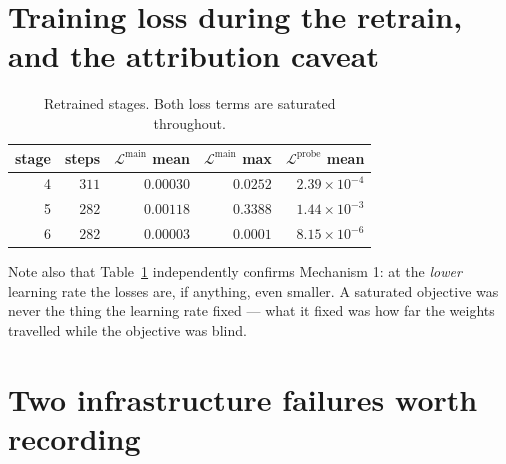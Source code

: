\documentclass[11pt]{article}
\theoremstyle{definition}
\begin{document}
\section{Training loss during the retrain, and the attribution caveat}
\label{sec:attribution}

\begin{table}[h]
\centering
\begin{tabular}{rrrrr}
\toprule
stage & steps & $\mathcal{L}^{\mathrm{main}}$ mean & $\mathcal{L}^{\mathrm{main}}$ max & $\mathcal{L}^{\mathrm{probe}}$ mean\\
\midrule
4 & $311$ & $0.00030$ & $0.0252$ & $2.39\times10^{-4}$\\
5 & $282$ & $0.00118$ & $0.3388$ & $1.44\times10^{-3}$\\
6 & $282$ & $0.00003$ & $0.0001$ & $8.15\times10^{-6}$\\
\bottomrule
\end{tabular}
\caption{Retrained stages. Both loss terms are saturated throughout.}
\label{tab:retrain-loss}
\end{table}

\begin{center}
\end{center}

Note also that Table~\ref{tab:retrain-loss} independently confirms Mechanism 1: at the \emph{lower} learning rate the losses are, if anything, even smaller. A saturated objective was never the thing the learning rate fixed --- what it fixed was how far the weights travelled while the objective was blind.

\section{Two infrastructure failures worth recording}
\end{document}
